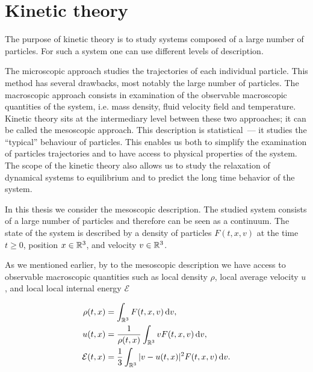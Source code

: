 \section{Kinetic theory} %
\label{sec:kinetic_theory}
\renewcommand{\theequation}{\thesection.\arabic{equation}}
The purpose of kinetic theory is to study systems composed of a large number of particles. For such a system one can use different levels of description.

The microscopic approach studies the trajectories of each individual particle. This method has several drawbacks, most notably the large number of particles.
The macroscopic approach consists in examination of the observable macroscopic quantities of the system, i.e. mass density, fluid velocity field and temperature. Kinetic theory sits at the intermediary level between these two approaches; it can be called the mesoscopic approach. This description is statistical~--- it studies the \enquote{typical} behaviour of  particles. This enables us both to  simplify the examination of particles trajectories and to have access to physical properties of the system. The scope of the kinetic theory also allows us to study the relaxation of dynamical systems to equilibrium and to predict the long time behavior of the system.

In this thesis we consider the mesoscopic description. The studied system consists of a large number of particles and therefore can be seen   as a continuum. The state of the system is described by a density of particles $F(t,x,v)$ at the time $t\ge 0$, position $x\in {\mathbb {R}^3}$, and velocity $v\in{\mathbb {R}^3}$.

As we mentioned earlier, by to the mesoscopic description we have access to observable macroscopic quantities such as local density $\rho$, local average velocity $u$, and local local internal energy $\mathcal E$%

\begin{equation}\label{eq:i:rE}
\begin{aligned}
	\rho(t,x) &= \int_{{\mathbb R^3}} F(t,x,v){\,\mathrm{d} v},\\ u(t,x)&=\frac{1}{\rho(t,x)}\int_{{\mathbb R^3}} vF(t,x,v){\,\mathrm{d} v},\\
	\mathcal E(t,x) &=\frac{1}{3}\int_{{\mathbb R^3}} |v-u(t,x)|^2F(t,x,v){\,\mathrm{d} v}.
\end{aligned}
\end{equation} 


